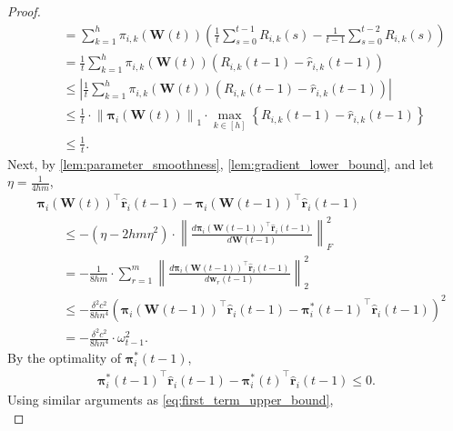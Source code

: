 \documentclass[10pt]{article}
\def\rvr{{\mathbf{r}}}
\def\rvw{{\mathbf{w}}}
\def\rvpi{{\boldsymbol{\pi}}}
\def\rmW{{\mathbf{W}}}
\begin{document}
\begin{proof}
\begin{equation}
\begin{split}
    &\qquad = \sum\limits_{k=1}^{h}{ \pi_{i,k}\left(\rmW(t)\right) \left( \frac{1}{t} \sum\limits_{s=0}^{t-1}{R_{i,k}(s)} - \frac{1}{t-1} \sum\limits_{s=0}^{t-2}{R_{i,k}(s)} \right) } \\
    &\qquad = \frac{1}{t} \sum\limits_{k=1}^{h}{ \pi_{i,k}\left(\rmW(t)\right) \left( R_{i,k}(t-1) - \hat{r}_{i,k}(t-1) \right)} \\
    &\qquad \le \left| \frac{1}{t} \sum\limits_{k=1}^{h}{ \pi_{i,k}\left(\rmW(t)\right) \left( R_{i,k}(t-1) - \hat{r}_{i,k}(t-1) \right)} \right| \\
    &\qquad \le \frac{1}{t} \cdot \left\| \rvpi_{i}\left(\rmW(t)\right) \right\|_1 \cdot \max\limits_{k \in [h]}{\left\{ R_{i,k}(t-1) - \hat{r}_{i,k}(t-1) \right\}} \\
    &\qquad \le \frac{1}{t}.
\end{split}
\end{equation}
Next, by \cref{lem:parameter_smoothness}, \cref{lem:gradient_lower_bound}, and let $\eta = \frac{1}{4 h m}$,
\begin{equation}
\label{eq:second_term_upper_bound}
\begin{split}
    &\rvpi_i\left(\rmW(t)\right)^\top \hat{\rvr}_i(t-1) - \rvpi_i\left(\rmW(t-1)\right)^\top \hat{\rvr}_i(t-1) \\
    &\qquad \le - \left( \eta - 2 h m \eta^2 \right) \cdot \left\| \frac{d \rvpi_i\left(\rmW(t-1)\right)^\top \hat{\rvr}_i(t-1) }{d \rmW(t-1)} \right\|_F^2 \\
    &\qquad = - \frac{1}{8 h m} \cdot \sum\limits_{r=1}^{m}{ \left\| \frac{d \rvpi_i\left(\rmW(t-1)\right)^\top \hat{\rvr}_i(t-1) }{d \rvw_r(t-1)} \right\|_2^2 } \\
    &\qquad \le - \frac{\delta^2 c^2}{8 h n^4} \left( \rvpi_i\left(\rmW(t-1)\right)^\top \hat{\rvr}_i(t-1) - {\rvpi_i^*(t-1)}^\top \hat{\rvr}_i(t-1) \right)^2 \\
    &\qquad = - \frac{\delta^2 c^2}{8 h n^4} \cdot \omega_{t-1}^2.
\end{split}    
\end{equation}
By the optimality of ${\rvpi_i^*(t-1)}$,
\begin{equation}
\label{eq:fourth_term_upper_bound}
\begin{split}
    {\rvpi_i^*(t-1)}^\top \hat{\rvr}_i(t-1) - {\rvpi_i^*(t)}^\top \hat{\rvr}_i(t-1) \le 0.
\end{split}
\end{equation}
Using similar arguments as \cref{eq:first_term_upper_bound},
\begin{equation}

\end{equation}
\end{proof}
\end{document}
